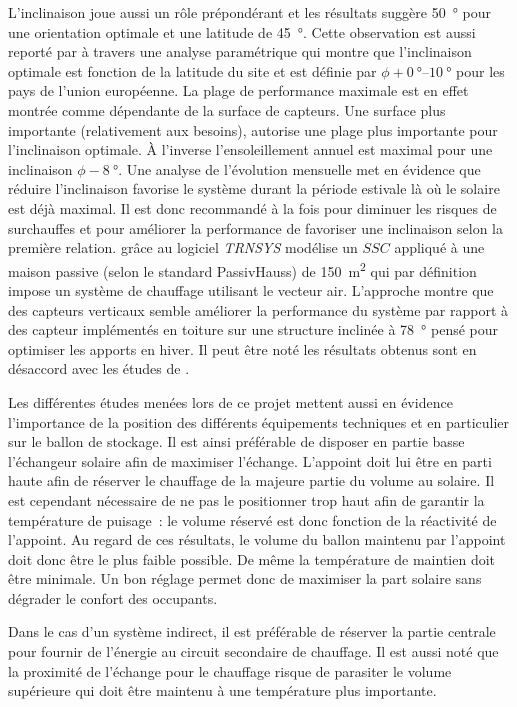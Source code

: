 L’inclinaison joue aussi un rôle prépondérant et les résultats suggère \SI{50}{\degree}
pour une orientation optimale et une latitude de \SI{45}{\degree}. Cette observation est
aussi reporté par \textcite{Shariah2002587} à travers une analyse paramétrique qui montre
que l’inclinaison optimale est fonction de la latitude du site et est définie par $\phi +
\SIrange{0}{10}{\degree}$ pour les pays de l’union européenne. La plage de performance
maximale est en effet montrée comme dépendante de la surface de capteurs.
Une surface plus importante (relativement aux besoins), autorise une plage plus importante
pour l’inclinaison optimale. À l’inverse l’ensoleillement annuel est maximal pour
une inclinaison $\phi - \SI{8}{\degree}$. Une analyse de l’évolution mensuelle met
en évidence que réduire l’inclinaison favorise le système durant la période estivale
là où le solaire est déjà maximal. Il est donc recommandé à la fois pour diminuer
les risques de surchauffes et pour améliorer la performance de favoriser une
inclinaison selon la première relation.
\textcite{Badescu2006129} grâce au logiciel \textit{TRNSYS} modélise un $SSC$
appliqué à une maison passive (selon le standard PassivHauss) de \SI{150}{\metre\squared}
qui par définition impose un système de chauffage utilisant le vecteur air. L’approche montre que des
capteurs verticaux semble améliorer la performance du système par rapport à des
capteur implémentés en toiture sur une structure inclinée à \SI{78}{\degree} pensé pour optimiser les apports
en hiver. Il peut être noté les résultats obtenus sont en désaccord avec les études
de \textcite{Task26C2007,Shariah2002587}.

Les différentes études menées lors de ce projet mettent aussi en évidence l’importance
de la position des différents équipements techniques et en particulier sur le ballon
de stockage. Il est ainsi préférable de disposer en partie basse l’échangeur solaire
afin de maximiser l’échange. L’appoint doit lui être en parti haute afin de réserver
le chauffage de la majeure partie du volume au solaire. Il est cependant nécessaire
de ne pas le positionner trop haut afin de garantir la température de puisage~: le volume
réservé est donc fonction de la réactivité de l’appoint.
Au regard de ces résultats, le volume du ballon maintenu par l’appoint doit donc
être le plus faible possible. De même la température de maintien doit être minimale.
Un bon réglage permet donc de maximiser la part solaire sans dégrader le confort des occupants.

Dans le cas d’un système indirect, il est préférable de réserver la partie centrale
pour fournir de l’énergie au circuit secondaire de chauffage. Il est aussi noté que
la proximité de l’échange pour le chauffage risque de parasiter le volume supérieure
qui doit être maintenu à une température plus importante.

